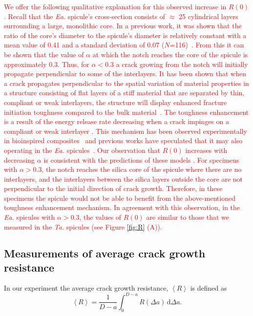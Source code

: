 \documentclass[12pt,onecolumn]{article}
\makeatletter
\newcommand{\TA}{\textit{Ta.\@}\xspace}
\newcommand{\EA}{\textit{Ea.\@}\xspace}
\makeatother
\begin{document}
\begin{bibunit}
\textcolor{red}{We offer the following qualitative explanation for this observed increase in $R(0)$. Recall that the \EA spicule's cross-section consists of $\approx$ 25 cylindrical layers surrounding a large, monolithic core. In a previous work, it was shown that the ratio of the core's diameter to the spicule's diameter is relatively constant with a mean value of 0.41 and a standard deviation of 0.07 ($N$=116)~\cite{monn2015new}. From this it can be shown that the value of $\alpha$ at which the notch reaches the core of the spicule is approximately 0.3.
%
Thus, for $\alpha<$0.3 a crack growing from the notch will initially propagate perpendicular to some of the interlayers. It has been shown that when a crack propagates perpendicular to the spatial variation of material properties in a structure consisting of flat layers of a stiff material that are separated by thin, compliant or weak interlayers, the structure will display enhanced fracture initiation toughness compared to the bulk material~\cite{fratzl2007hindered, kolednik2011bioinspired, kolednik2014improvements}. The toughness enhancement is a result of the energy release rate decreasing when a crack impinges on a compliant or weak interlayer \cite{fratzl2007hindered, kolednik2011bioinspired}. This mechanism has been observed experimentally in bioinspired composites~\cite{zechner2013fracture, sistaninia2018design} and previous works have speculated that it may also operating in the \EA spicules~\cite{fratzl2007hindered, kolednik2011bioinspired}. Our observation that $R(0)$ increases with decreasing $\alpha$ is consistent with the predictions of these models \cite{fratzl2007hindered, kolednik2014improvements, kolednik2011bioinspired}.
%
For specimens with $\alpha>$0.3, the notch reaches the silica core of the spicule where there are no interlayers, and the interlayers between the silica layers outside the core are not perpendicular to the initial direction of crack growth. Therefore, in these specimens the spicule would not be able to benefit from the above-mentioned toughness enhancement mechanism. In agreement with this observation, in the \EA spicules with $\alpha>$0.3, the values of $R(0)$ are similar to those that we measured in the \TA spicules (see Figure \ref{fig:R} (A)).}

\subsection{Measurements of average crack growth resistance}
\label{sec:avgR}
In our experiment the average crack growth resistance, $\left< R \right>$ is defined as
%
\begin{equation}
    \label{eq:avgRdef}
    \left< R \right> =\frac{1}{D-a}\int_0^{D-a}R(\Delta a)\,\mathrm{d}\Delta a.
\end{equation}
%


\end{bibunit}
\end{document}
